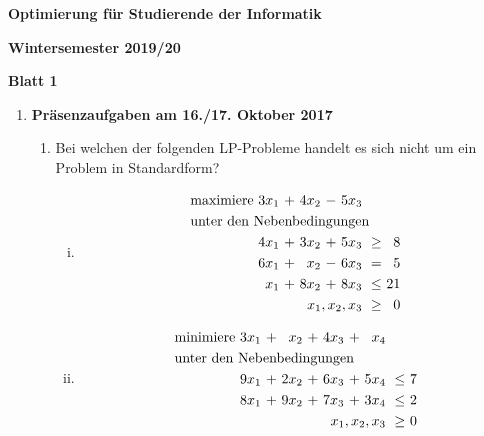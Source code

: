 \documentclass[10pt, a4paper]{article}
\begin{document}
\begin{center}
\begin{Large}
\textbf{Optimierung für Studierende der Informatik}
\end{Large}

\textbf{}
	
\vspace{0.5cm}

\textbf{Wintersemester 2019/20}

\textbf{Blatt 1}

\vspace{0.5cm}
\end{center}

\small

\begin{enumerate}[\bfseries A:]


\item \textbf{Präsenzaufgaben am 16./17. Oktober 2017}

\begin{enumerate}[\bfseries 1.]

\item Bei welchen der folgenden LP-Probleme handelt es sich nicht um ein Problem in Standardform?
\begin{enumerate}[(i)]
\item \begin{align*}
\begin{alignedat}{5}
& \text{maximiere } & 3x_1 &\ + &\ 4x_2 &\ - &\ 5x_3 & & \\
& \rlap{unter den Nebenbedingungen} & & & & & & & \\
&& 4x_1 &\ + &\ 3x_2 &\ + &\ 5x_3 &\ \geq &\  8 \\
&& 6x_1 &\ + &\  x_2 &\ - &\ 6x_3 &\ =    &\  5 \\
&& x_1 &\ + &\ 8x_2 &\ + &\ 8x_3 &\ \leq &\ 21 \\
&& & & & & \llap{$x_1, x_2, x_3$} &\ \geq &\ 0 
\end{alignedat}
\end{align*}

\item \begin{align*}
\begin{alignedat}{6}
& \text{minimiere } & 3x_1 &\ + &\ x_2 &\ + &\ 4x_3 &\ + &\ x_4 & & \\
& \rlap{unter den Nebenbedingungen} & & & & & & & & & \\
&& 9x_1 &\ + &\ 2x_2 &\ + &\ 6x_3 &\ + &\ 5x_4 &\ \leq &\  7 \\
&& 8x_1 &\ + &\ 9x_2 &\ + &\ 7x_3 &\ + &\ 3x_4 &\ \leq &\  2 \\
&& & & & & & & \llap{$x_1, x_2, x_3$} &\ \geq &\ 0
\end{alignedat}
\end{align*}


\end{enumerate}
\end{enumerate}
\end{enumerate}
\end{document}
